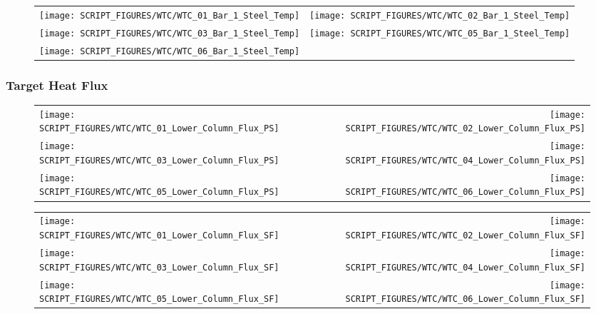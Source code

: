\begin{figure}[p]
\begin{tabular*}{\textwidth}{l@{\extracolsep{\fill}}r}
\texttt{[image: SCRIPT\_FIGURES/WTC/WTC\_01\_Bar\_1\_Steel\_Temp]} &
\texttt{[image: SCRIPT\_FIGURES/WTC/WTC\_02\_Bar\_1\_Steel\_Temp]} \\
\texttt{[image: SCRIPT\_FIGURES/WTC/WTC\_03\_Bar\_1\_Steel\_Temp]} &
\texttt{[image: SCRIPT\_FIGURES/WTC/WTC\_05\_Bar\_1\_Steel\_Temp]} \\
\texttt{[image: SCRIPT\_FIGURES/WTC/WTC\_06\_Bar\_1\_Steel\_Temp]}
\end{tabular*}
\end{figure}

\clearpage

\subsubsection{Target Heat Flux}

\begin{figure}[p]
\begin{tabular*}{\textwidth}{l@{\extracolsep{\fill}}r}
\texttt{[image: SCRIPT\_FIGURES/WTC/WTC\_01\_Lower\_Column\_Flux\_PS]} &
\texttt{[image: SCRIPT\_FIGURES/WTC/WTC\_02\_Lower\_Column\_Flux\_PS]} \\
\texttt{[image: SCRIPT\_FIGURES/WTC/WTC\_03\_Lower\_Column\_Flux\_PS]} &
\texttt{[image: SCRIPT\_FIGURES/WTC/WTC\_04\_Lower\_Column\_Flux\_PS]} \\
\texttt{[image: SCRIPT\_FIGURES/WTC/WTC\_05\_Lower\_Column\_Flux\_PS]} &
\texttt{[image: SCRIPT\_FIGURES/WTC/WTC\_06\_Lower\_Column\_Flux\_PS]}
\end{tabular*}
\end{figure}

\begin{figure}[p]
\begin{tabular*}{\textwidth}{l@{\extracolsep{\fill}}r}
\texttt{[image: SCRIPT\_FIGURES/WTC/WTC\_01\_Lower\_Column\_Flux\_SF]} &
\texttt{[image: SCRIPT\_FIGURES/WTC/WTC\_02\_Lower\_Column\_Flux\_SF]} \\
\texttt{[image: SCRIPT\_FIGURES/WTC/WTC\_03\_Lower\_Column\_Flux\_SF]} &
\texttt{[image: SCRIPT\_FIGURES/WTC/WTC\_04\_Lower\_Column\_Flux\_SF]} \\
\texttt{[image: SCRIPT\_FIGURES/WTC/WTC\_05\_Lower\_Column\_Flux\_SF]} &
\texttt{[image: SCRIPT\_FIGURES/WTC/WTC\_06\_Lower\_Column\_Flux\_SF]}
\end{tabular*}
\end{figure}

